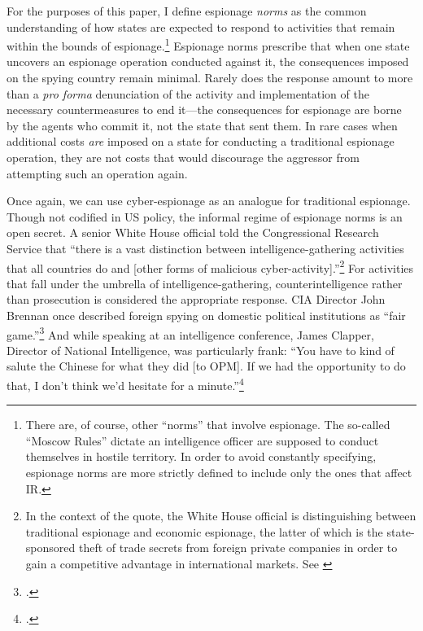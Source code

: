 \documentclass[14pt]{extarticle}
\begin{document}
For the purposes of this paper, I define espionage \emph{norms} as the common understanding of how states are expected to respond to activities that remain within the bounds of espionage.\footnote{There are, of course, other \enquote{norms} that involve espionage. The so-called \enquote{Moscow Rules} dictate an intelligence officer are supposed to conduct themselves in hostile territory. In order to avoid constantly specifying, espionage norms are more strictly defined to include only the ones that affect IR.} Espionage norms prescribe that when one state uncovers an espionage operation conducted against it, the consequences imposed on the spying country remain minimal. Rarely does the response amount to more than a \emph{pro forma} denunciation of the activity and implementation of the necessary countermeasures to end it---the consequences for espionage are borne by the agents who commit it, not the state that sent them. In rare cases when additional costs \emph{are} imposed on a state for conducting a traditional espionage operation, they are not costs that would discourage the aggressor from attempting such an operation again.

Once again, we can use cyber-espionage as an analogue for traditional espionage. Though not codified in US policy, the informal regime of espionage norms is an open secret. A senior White House official told the Congressional Research Service that \enquote{there is a vast distinction between intelligence-gathering activities that all countries do and [other forms of malicious cyber-activity].}\footnote{In the context of the quote, the White House official is distinguishing between traditional espionage and economic espionage, the latter of which is the state-sponsored theft of trade secrets from foreign private companies in order to gain a competitive advantage in international markets. See \cite{finklea_cyber_2015}} For activities that fall under the umbrella of intelligence-gathering, counterintelligence rather than prosecution is considered the appropriate response. CIA Director John Brennan once described foreign spying on domestic political institutions as \enquote{fair game.}\footcite{sanger_u.s._2016} And while speaking at an intelligence conference, James Clapper, Director of National Intelligence, was particularly frank: \enquote{You have to kind of salute the Chinese for what they did [to OPM]. If we had the opportunity to do that, I don’t think we’d hesitate for a minute.}\footcite{pepitone_clapper_2015}
\end{document}
